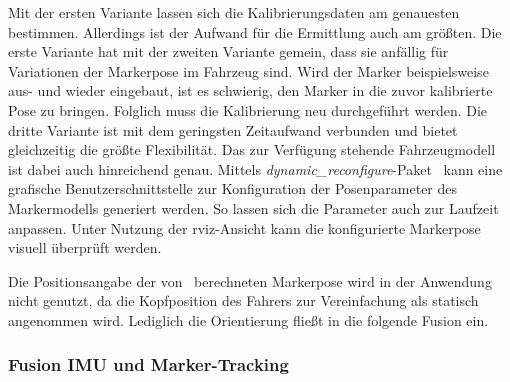 Mit der ersten Variante lassen sich die Kalibrierungsdaten am genauesten bestimmen.
Allerdings ist der Aufwand für die Ermittlung auch am größten.
Die erste Variante hat mit der zweiten Variante gemein, dass sie anfällig für Variationen der Markerpose im Fahrzeug sind. Wird der Marker beispielsweise aus- und wieder eingebaut, ist es schwierig, den Marker in die zuvor kalibrierte Pose zu bringen.
Folglich muss die Kalibrierung neu durchgeführt werden.
Die dritte Variante ist mit dem geringsten Zeitaufwand verbunden und bietet gleichzeitig die größte Flexibilität.
Das zur Verfügung stehende Fahrzeugmodell ist dabei auch hinreichend genau.
Mittels \emph{dynamic\_reconfigure}-Paket~\cite{ros_dynamic_reconfigure} kann eine grafische Benutzerschnittstelle zur Konfiguration der Posenparameter des Markermodells generiert werden.
So lassen sich die Parameter auch zur Laufzeit anpassen.
Unter Nutzung der rviz-Ansicht kann die konfigurierte Markerpose visuell überprüft werden.

Die Positionsangabe der von \alvar\ berechneten Markerpose wird in der Anwendung nicht genutzt, da die Kopfposition des Fahrers zur Vereinfachung als statisch angenommen wird.
Lediglich die Orientierung fließt in die folgende Fusion ein.

\subsubsection{Fusion IMU und Marker-Tracking}
\label{headracking_markerfusion_subsubsec}

